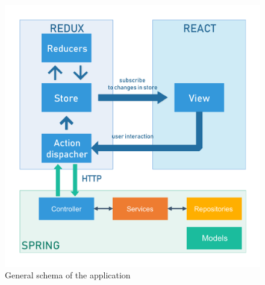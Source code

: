 \begin{figure}[H]
\centering
\includegraphics[]{uml/general.pdf} 
\caption{General schema of the application}
\end{figure}